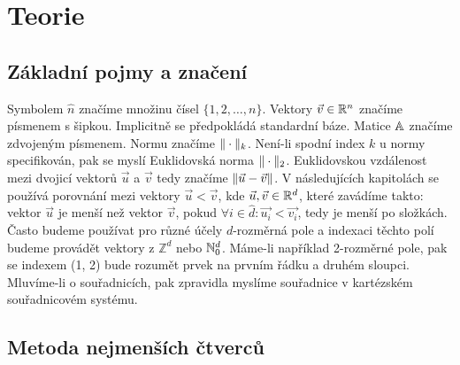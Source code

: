 \chapter{Teorie}

\section{Základní pojmy a značení}

Symbolem $\hat n$ značíme množinu čísel $\{1, 2, \ldots, n\}$. Vektory $\vec{v} \in \mathbb{R}^n$ značíme písmenem s šipkou. Implicitně se předpokládá standardní báze. Matice $\mathbb{A}$ značíme zdvojeným písmenem. Normu značíme $\|\cdot\|_k$. Není-li spodní index $k$ u normy specifikován, pak se myslí Euklidovská norma $\|\cdot\|_2$. Euklidovskou vzdálenost mezi dvojicí vektorů $\vec{u}$ a $\vec{v}$ tedy značíme $\|\vec{u} - \vec{v}\|$. V následujících kapitolách se používá porovnání mezi vektory $\vec{u} < \vec{v}$, kde $\vec{u}, \vec{v} \in \mathbb{R}^d$, které zavádíme takto: vektor $\vec{u}$ je menší než vektor $\vec{v}$, pokud $\forall i \in \hat{d}: \vec{u_i} < \vec{v_i}$, tedy je menší po složkách. Často budeme používat pro různé účely $d$-rozměrná pole a indexaci těchto polí budeme provádět vektory z $\mathbb{Z}^d$ nebo $\mathbb{N}_0^d$. Máme-li například 2-rozměrné pole, pak se indexem (1, 2) bude rozumět prvek na prvním řádku a druhém sloupci. Mluvíme-li o souřadnicích, pak zpravidla myslíme souřadnice v kartézském souřadnicovém systému.

\section{Metoda nejmenších čtverců}

